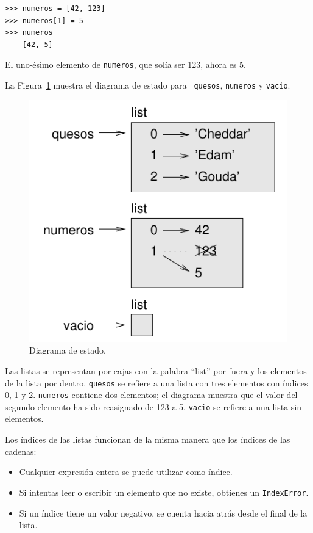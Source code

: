 \documentclass[10pt]{book}
\begin{document}
\begin{verbatim}
>>> numeros = [42, 123]
>>> numeros[1] = 5
>>> numeros
    [42, 5]
\end{verbatim}
%
El uno-ésimo elemento de {\tt numeros}, que
solía ser 123, ahora es 5.

La Figura~\ref{fig.liststate} muestra
el diagrama de estado para {\tt
quesos}, {\tt numeros} y {\tt vacio}.

\begin{figure}
\centerline
{\includegraphics[scale=0.8]{figs/liststate.pdf}}
\caption{Diagrama de estado.}
\label{fig.liststate}
\end{figure}

Las listas se representan por cajas con la palabra ``list'' por fuera
y los elementos de la lista por dentro.  {\tt quesos} se refiere a
una lista con tres elementos con índices 0, 1 y 2.
{\tt numeros} contiene dos elementos; el diagrama muestra que el
valor del segundo elemento ha sido reasignado de 123 a 5.
{\tt vacio} se refiere a una lista sin elementos.

Los índices de las listas funcionan de la misma manera que los índices de las cadenas:

\begin{itemize}

\item Cualquier expresión entera se puede utilizar como índice.

\item Si intentas leer o escribir un elemento que no existe,
obtienes un {\tt IndexError}.

\item Si un índice tiene un valor negativo, se cuenta hacia atrás desde el
final de la lista.

\end{itemize}
\end{document}

